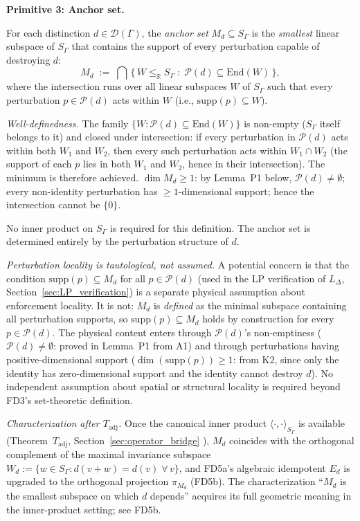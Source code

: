 \documentclass[11pt]{article}
\theoremstyle{remark}
\begin{document}
\begin{tcolorbox}[defbox, title={$\mathrm{FD3}$ (Anchor Set): Minimal Enforcement Subspace}]
\noindent\textbf{Primitive 3: Anchor set.}

For each distinction $d \in \mathcal{D}(\Gamma)$, the \emph{anchor set} $M_d \subseteq S_\Gamma$ is the \emph{smallest} linear subspace of $S_\Gamma$ that contains the support of every perturbation capable of destroying $d$:
\[
M_d \;:=\; \bigcap\, \bigl\{\, W \leq_\mathbb{R} S_\Gamma \;:\; \mathcal{P}(d) \subseteq \mathrm{End}(W) \,\bigr\},
\]
where the intersection runs over all linear subspaces $W$ of $S_\Gamma$ such that every perturbation $p \in \mathcal{P}(d)$ acts within $W$ (i.e., $\mathrm{supp}(p) \subseteq W$).

\smallskip\noindent\textit{Well-definedness.}  The family $\{W : \mathcal{P}(d) \subseteq \mathrm{End}(W)\}$ is non-empty ($S_\Gamma$ itself belongs to it) and closed under intersection: if every perturbation in $\mathcal{P}(d)$ acts within both $W_1$ and $W_2$, then every such perturbation acts within $W_1 \cap W_2$ (the support of each $p$ lies in both $W_1$ and $W_2$, hence in their intersection).  The minimum is therefore achieved.  $\dim M_d \ge 1$: by Lemma~P1 below, $\mathcal{P}(d) \ne \emptyset$; every non-identity perturbation has $\ge 1$-dimensional support; hence the intersection cannot be $\{0\}$.

No inner product on $S_\Gamma$ is required for this definition.  The anchor set is determined entirely by the perturbation structure of $d$.

\smallskip\noindent\textit{Perturbation locality is tautological, not assumed.}  A potential concern is that the condition $\mathrm{supp}(p) \subseteq M_d$ for all $p \in \mathcal{P}(d)$ (used in the LP verification of $L_\Delta$, Section~\ref{sec:LP_verification}) is a separate physical assumption about enforcement locality.  It is not: $M_d$ is \emph{defined} as the minimal subspace containing all perturbation supports, so $\mathrm{supp}(p) \subseteq M_d$ holds by construction for every $p \in \mathcal{P}(d)$.  The physical content enters through $\mathcal{P}(d)$'s non-emptiness ($\mathcal{P}(d) \ne \emptyset$: proved in Lemma~P1 from A1) and through perturbations having positive-dimensional support ($\dim(\mathrm{supp}(p)) \ge 1$: from K2, since only the identity has zero-dimensional support and the identity cannot destroy $d$).  No independent assumption about spatial or structural locality is required beyond FD3's set-theoretic definition.

\smallskip\noindent\textit{Characterization after $T_{\mathrm{adj}}$.}  Once the canonical inner product $\langle\cdot,\cdot\rangle_{S_\Gamma}$ is available (Theorem~$T_{\mathrm{adj}}$, Section~\ref{sec:operator_bridge} ), $M_d$ coincides with the orthogonal complement of the maximal invariance subspace $W_d := \{w \in S_\Gamma : d(v+w) = d(v) \;\forall\, v\}$, and FD5a's algebraic idempotent $E_d$ is upgraded to the orthogonal projection $\pi_{M_d}$ (FD5b).  The characterization ``$M_d$ is the smallest subspace on which $d$ depends'' acquires its full geometric meaning in the inner-product setting; see FD5b.

\end{tcolorbox}
\end{document}
